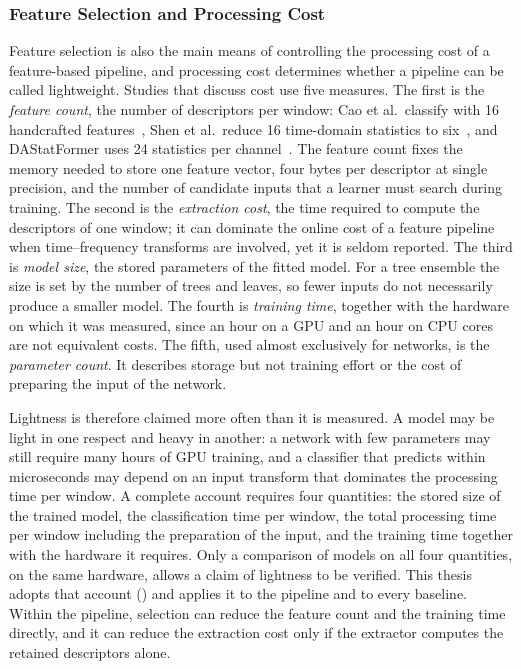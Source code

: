 \subsubsection{Feature Selection and Processing Cost}
\label{sec:chap2ProcessingCost}
Feature selection is also the main means of controlling the processing cost of a feature-based pipeline, and processing cost determines whether a pipeline can be called lightweight. Studies that discuss cost use five measures. The first is the \emph{feature count}, the number of descriptors per window: Cao et al.\ classify with 16 handcrafted features~\cite{caoxin2023opendataset}, Shen et al.\ reduce 16 time-domain statistics to six~\cite{shen2024abnormal}, and DAStatFormer uses 24 statistics per channel~\cite{dione2026dastatformer}. The feature count fixes the memory needed to store one feature vector, four bytes per descriptor at single precision, and the number of candidate inputs that a learner must search during training. The second is the \emph{extraction cost}, the time required to compute the descriptors of one window; it can dominate the online cost of a feature pipeline when time--frequency transforms are involved, yet it is seldom reported. The third is \emph{model size}, the stored parameters of the fitted model. For a tree ensemble the size is set by the number of trees and leaves, so fewer inputs do not necessarily produce a smaller model. The fourth is \emph{training time}, together with the hardware on which it was measured, since an hour on a GPU and an hour on CPU cores are not equivalent costs. The fifth, used almost exclusively for networks, is the \emph{parameter count}. It describes storage but not training effort or the cost of preparing the input of the network.

Lightness is therefore claimed more often than it is measured. A model may be light in one respect and heavy in another: a network with few parameters may still require many hours of GPU training, and a classifier that predicts within microseconds may depend on an input transform that dominates the processing time per window. A complete account requires four quantities: the stored size of the trained model, the classification time per window, the total processing time per window including the preparation of the input, and the training time together with the hardware it requires. Only a comparison of models on all four quantities, on the same hardware, allows a claim of lightness to be verified. This thesis adopts that account () and applies it to the pipeline and to every baseline. Within the pipeline, selection can reduce the feature count and the training time directly, and it can reduce the extraction cost only if the extractor computes the retained descriptors alone.

